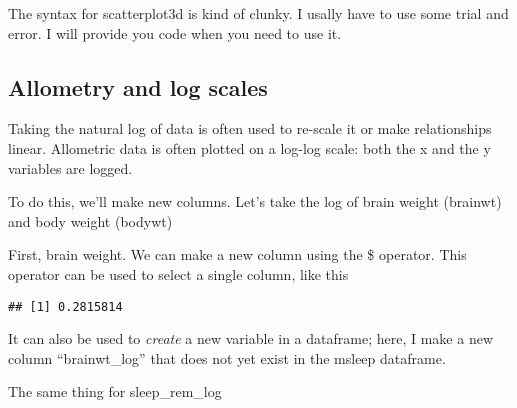 \documentclass[
]{book}
\newenvironment{Shaded}{\begin{snugshade}}{\end{snugshade}}
\newcommand{\AttributeTok}[1]{\textcolor[rgb]{0.77,0.63,0.00}{#1}}
\newcommand{\FunctionTok}[1]{\textcolor[rgb]{0.00,0.00,0.00}{#1}}
\newcommand{\NormalTok}[1]{#1}
\newcommand{\OtherTok}[1]{\textcolor[rgb]{0.56,0.35,0.01}{#1}}
\newcommand{\SpecialCharTok}[1]{\textcolor[rgb]{0.00,0.00,0.00}{#1}}
\begin{document}
The syntax for scatterplot3d is kind of clunky. I usally have to use some trial and error.
I will provide you code when you need to use it.

\hypertarget{allometry-and-log-scales-1}{%
\subsection{Allometry and log scales}\label{allometry-and-log-scales-1}}

Taking the natural log of data is often used to re-scale it or make relationships linear. Allometric data is often plotted on a log-log scale: both the x and the y variables are logged.

To do this, we'll make new columns. Let's take the log of brain weight (brainwt) and body weight (bodywt)

First, brain weight. We can make a new column using the \$ operator. This operator can be used to select a single column, like this

\begin{Shaded}
\end{Shaded}

\begin{verbatim}
## [1] 0.2815814
\end{verbatim}

It can also be used to \emph{create} a new variable in a dataframe; here, I make a new column ``brainwt\_log'' that does not yet exist in the msleep dataframe.

\begin{Shaded}
\end{Shaded}

The same thing for sleep\_rem\_log

\begin{Shaded}
\end{Shaded}
\end{document}
